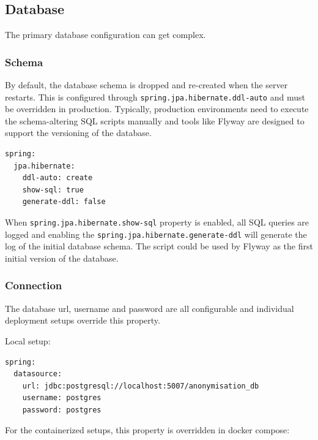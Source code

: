 \documentclass[a4paper,twoside,12pt]{book}
\begin{document}
\subsection{Database}

The primary database configuration can get complex.

\subsubsection{Schema}

By default, the database schema is dropped and re-created when the server restarts. This is configured through \verb|spring.jpa.hibernate.ddl-auto| and must be overridden in production. Typically, production environments need to execute the schema-altering SQL scripts manually and tools like Flyway \cite{bib:flyway} are designed to support the versioning of the database.

\begin{verbatim}
spring:
  jpa.hibernate:
    ddl-auto: create
    show-sql: true
    generate-ddl: false
\end{verbatim}


When \verb|spring.jpa.hibernate.show-sql| property is enabled, all SQL queries are logged and enabling the \verb|spring.jpa.hibernate.generate-ddl| will generate the log of the initial database schema. The script could be used by Flyway as the first initial version of the database.

\subsubsection{Connection}

The database url, username and password are all configurable and individual deployment setups override this property.

Local setup:

\begin{verbatim}
spring:
  datasource:
    url: jdbc:postgresql://localhost:5007/anonymisation_db
    username: postgres
    password: postgres
\end{verbatim}

For the containerized setups, this property is overridden in docker compose:
\end{document}
